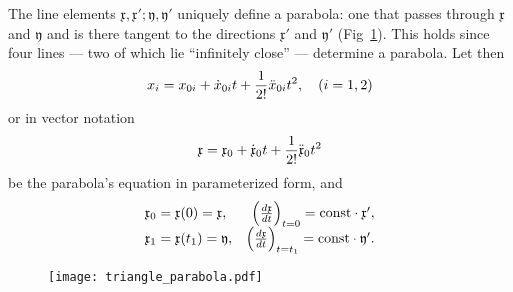 \documentclass[11pt]{book} \usepackage{amssymb}
\newcommand{\myvec}[1]{\mathfrak{#1}}
\newcommand{\vecx}{\myvec{x}}
\newcommand{\vecy}{\myvec{y}}
\newcommand{\vecderiv}[1]{\dot{\myvec{#1}}}
\newcommand{\vecderivv}[1]{\ddot{\myvec{#1}}}
\begin{document}
The line elements $\vecx,\vecx';\vecy,\vecy'$ uniquely define
a parabola: one that passes through  $\vecx$ and $\vecy$ and is there
tangent to the directions $\vecx'$ and $\vecy'$ 
(Fig~\ref{fig:triangle_parabola}). This holds since four lines --- two of
which lie ``infinitely close'' --- determine a parabola. Let then
\begin{equation}
  \label{eq:parabola_def1}
  x_i=x_{0i}+\dot{x}_{0i}t+{1\over 2!}\ddot{x}_{0i}t^2, \quad(i=1,2)
\end{equation}
or in vector notation
\begin{equation}
  \label{eq:parabola_def2}
  \vecx=\vecx_0+\vecderiv{x}_0t+{1\over 2!}\vecderivv{x}_0t^2
\end{equation}
be the parabola's equation in parameterized form, and
\begin{equation}
  \label{eq:parabola_initial_def}
  \begin{array}{lrcl}
    \vecx_0=\vecx(0)=\vecx,& \left({d\vecx\over dt}\right)_{t=0}=\mbox{const}\cdot \vecx',\\
    \vecx_1=\vecx(t_1)=\vecy,& \left({d\vecx\over dt}\right)_{t=t_1}=\mbox{const}\cdot \vecy'.\\
  \end{array}  
\end{equation}

\begin{figure}[htp]
  \centering
  \texttt{[image: triangle\_parabola.pdf]}
  \caption{}
  \label{fig:triangle_parabola}
\end{figure}
\end{document}
